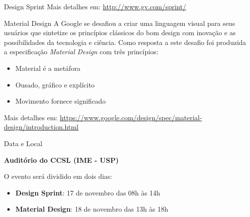 \documentclass[final]{beamer} %
\begin{document}
\begin{frame}{}
\begin{block}{\large Design Sprint}
      Mais detalhes em: \url{http://www.gv.com/sprint/}
    \end{block}
    \vfill
    \begin{block}{\large Material Design}
      A Google se desafiou a criar uma linguagem visual para seus usuários que sintetize os princípios clássicos do bom design com inovação e as possibilidades da tecnologia e ciência. Como resposta a este desafio foi produzida a especificação \textit{Material Design} com três princípios:

      \begin{itemize}
        \item Material é a metáfora
        \item Ousado, gráfico e explícito
        \item Movimento fornece significado
      \end{itemize}

      Mais detalhes em: \url{https://www.google.com/design/spec/material-design/introduction.html}
    \end{block}
    \vfill
    \begin{block}{\large Data e Local}
      \begin{center}
        \textbf{Auditório do CCSL (IME - USP)}
      \end{center}

        O evento será dividido em dois dias:

        \begin{itemize}
          \item \textbf{Design Sprint}: 17 de novembro das 08h às 14h
          \item \textbf{Material Design}: 18 de novembro das 13h às 18h
        \end{itemize}


\end{block}
\end{frame}
\end{document}
